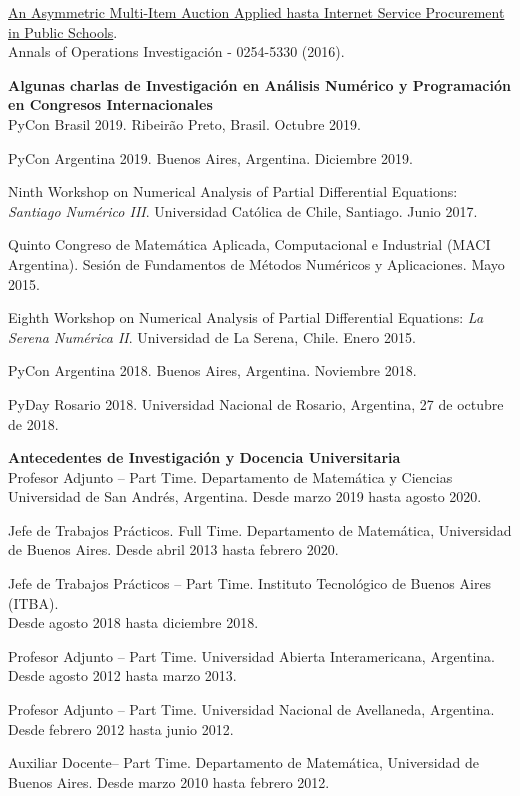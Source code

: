 \href{https://www.dropbox.com/s/1ai0z0pcyhskpzp/JM-2016.pdf?dl=0}
{\color{blue}An Asymmetric Multi-Item Auction Applied
hasta Internet Service Procurement in Public Schools}.\\
Annals of Operations Investigaci\'on - 0254-5330 (2016).

\textbf{Algunas charlas de Investigaci\'on en An\'alisis Num\'erico y Programaci\'on
en Congresos Internacionales}\\[6pt]
PyCon Brasil 2019. Ribeir\~ao Preto, Brasil. Octubre 2019.

PyCon Argentina 2019. Buenos Aires, Argentina. Diciembre 2019.

Ninth Workshop on Numerical Analysis of Partial Differential Equations: 
\emph{Santiago Num\'erico III}. Universidad Cat\'olica de Chile, Santiago. Junio 2017.

Quinto Congreso de Matem\'atica Aplicada, Computacional e Industrial (MACI Argentina).
Sesi\'on de Fundamentos de M\'etodos Num\'ericos y Aplicaciones. Mayo 2015.

Eighth Workshop on Numerical Analysis of Partial Differential Equations:
\emph{La Serena Num\'erica II}. Universidad de La Serena, Chile. Enero 2015.

PyCon Argentina 2018. Buenos Aires, Argentina. Noviembre 2018.

PyDay Rosario 2018. Universidad Nacional de Rosario, Argentina, 27 de octubre
de 2018.

\textbf{Antecedentes de Investigaci\'on y Docencia Universitaria}\\[6pt]
Profesor Adjunto -- Part Time. Departamento  de Matem\'atica y Ciencias
Universidad de San Andr\'es, Argentina. Desde marzo 2019 hasta agosto 2020.

Jefe de Trabajos Pr\'acticos. Full Time. 
Departamento  de Matem\'atica, Universidad de Buenos Aires. Desde abril 2013 hasta
febrero 2020.

Jefe de Trabajos Pr\'acticos -- Part Time. Instituto Tecnol\'ogico de Buenos Aires (ITBA).\\
Desde agosto 2018 hasta diciembre 2018.

Profesor Adjunto -- Part Time. Universidad Abierta Interamericana, Argentina.\\
Desde agosto 2012 hasta marzo 2013.

Profesor Adjunto -- Part Time. Universidad Nacional de Avellaneda, Argentina.
Desde febrero 2012 hasta junio 2012.

Auxiliar Docente-- Part Time. Departamento  de Matem\'atica,
Universidad de Buenos Aires. Desde marzo 2010 hasta febrero 2012.
